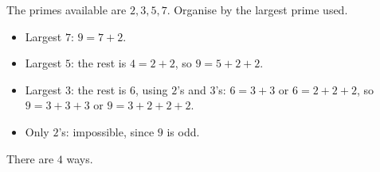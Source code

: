 The primes available are $2,3,5,7$. Organise by the largest prime used.
\begin{itemize}
\item Largest $7$: $9=7+2$.
\item Largest $5$: the rest is $4=2+2$, so $9=5+2+2$.
\item Largest $3$: the rest is $6$, using $2$'s and $3$'s: $6=3+3$ or $6=2+2+2$, so $9=3+3+3$ or $9=3+2+2+2$.
\item Only $2$'s: impossible, since $9$ is odd.
\end{itemize}
There are $\boxed{4}$ ways.
